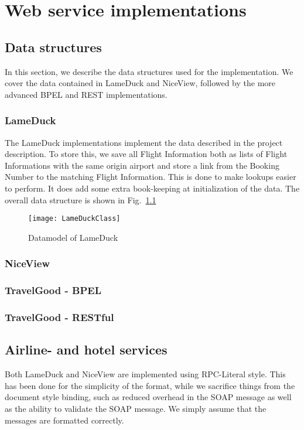 {\setlength{\chapterfontsize}{23pt}
\chapter{Web service implementations}
}

\section{Data structures}
In this section, we describe the data structures used for the implementation. We cover the data contained in LameDuck and NiceView, followed by the more advanced BPEL and REST implementations.

\subsection{LameDuck}
The LameDuck implementations implement the data described in the project description. To store this, we save all Flight Information both as lists of Flight Informations with the same origin airport and store a link from the Booking Number to the matching Flight Information. This is done to make lookups easier to perform. It does add some extra book-keeping at initialization of the data. The overall data structure is shown in Fig.~\ref{fig:lameduck_class}

\begin{figure}[htb]
\centering
\texttt{[image: LameDuckClass]}
\caption{Datamodel of LameDuck}
\label{fig:lameduck_class}
\end{figure}

\subsection{NiceView}

\subsection{TravelGood - BPEL}

\subsection{TravelGood - RESTful}

\section{Airline- and hotel services}
Both LameDuck and NiceView are implemented using RPC-Literal style. This has been done for the simplicity of the format, while we sacrifice things from the document style binding, such as reduced overhead in the SOAP message as well as the ability to validate the SOAP message. We simply assume that the messages are formatted correctly. 

